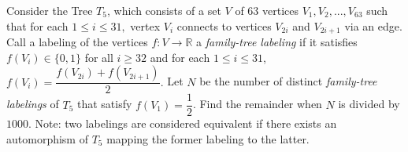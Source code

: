 Consider the Tree $T_5$, which consists of a set $V$ of $63$ vertices $V_1, V_2, ..., V_{63}$ such that for each $1 \leq i \leq 31,$ vertex $V_i$ connects to vertices $V_{2i}$ and $V_{2i+1}$ via an edge. Call a labeling of the vertices $f: V \to \mathbb{R}$ a \emph{family-tree labeling} if it satisfies $f(V_i) \in \{0, 1\}$ for all $i \geq 32$ and for each $1 \leq i \leq 31$, $f(V_i) = \dfrac{f(V_{2i}) + f(V_{2i+1})}{2}.$ Let $N$ be the number of distinct \emph{family-tree labelings} of $T_5$ that satisfy $f(V_1) = \dfrac{1}{2}$. Find the remainder when $N$ is divided by $1000.$ Note: two labelings are considered equivalent if there exists an automorphism of $T_5$ mapping the former labeling to the latter.
